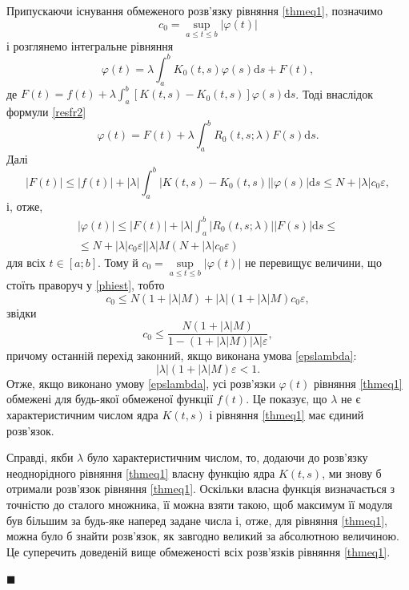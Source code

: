 \documentclass[14pt,twoside]{extreport}
\theoremstyle{mystyle}
\renewenvironment{proof}{{\bfseries Доведення.}}{$\blacksquare$}
\numberwithin{equation}{chapter}
\begin{document}
\begin{proof}
Припускаючи існування обмеженого розв'язку рівняння \eqref{thmeq1}, позначимо
\[
 c_0 = \sup\limits_{a \leqslant t \leqslant b} |\varphi (t)|
\]
і розглянемо інтегральне рівняння
\[
 \varphi(t) = \lambda \int_{a}^{b} K_0(t, s) \varphi(s) \mathrm{d}s + F(t),
\]
де $F(t) = f(t) + \lambda \int_{a}^{b} [K(t, s) - K_0(t, s)] \varphi(s) \mathrm{d}s$. Тоді внаслідок формули \eqref{resfr2}
\[
 \varphi(t) = F(t) + \lambda \int_{a}^{b} R_0(t, s; \lambda) F(s) \mathrm{d}s.
\]
Далі
\[
 |F(t)| \leqslant |f(t)| + |\lambda| \int_{a}^{b} |K(t, s) - K_0(t, s)| |\varphi(s)| \mathrm{d}s \leqslant N + |\lambda| c_0 \varepsilon,
\]
і, отже,
\begin{multline}\label{phiest}
 |\varphi(t)| \leqslant |F(t)| + |\lambda| \int_{a}^{b} |R_0(t, s; \lambda)| |F(s)| \mathrm{d}s \leqslant\\
 \leqslant N + |\lambda| c_0 \varepsilon | |\lambda| M (N + |\lambda| c_0 \varepsilon)
\end{multline}
для всіх $t\in[a; b]$. Тому й $c_0 = \sup\limits_{a \leqslant t \leqslant b} |\varphi(t)|$ не перевищує величини, що стоїть праворуч у \eqref{phiest}, тобто
\[
 c_0 \leqslant N(1+ |\lambda| M) + |\lambda| (1 + |\lambda|M) c_0 \varepsilon,
\]
звідки
\begin{equation}\label{c0est}
 c_0 \leqslant \frac{N(1 + |\lambda| M)}{1-(1 + |\lambda| M) |\lambda| \varepsilon},
\end{equation}
причому останній перехід законний, якщо виконана умова \eqref{epslambda}:
\[
 |\lambda| (1 + |\lambda| M) \varepsilon < 1.
\]
Отже, якщо виконано умову \eqref{epslambda}, усі розв'язки $\varphi(t)$ рівняння \eqref{thmeq1} обмежені для будь-якої обмеженої функції $f(t)$. Це показує, що $\lambda$ не є характеристичним числом ядра $K(t, s)$ і рівняння \eqref{thmeq1} має єдиний розв'язок.

Справді, якби $\lambda$ було характеристичним числом, то, додаючи до розв'язку неоднорідного рівняння \eqref{thmeq1} власну функцію ядра $K(t, s)$, ми знову б отримали розв'язок рівняння \eqref{thmeq1}. Оскільки власна функція визначається з точністю до сталого множника, її можна взяти такою, щоб максимум її модуля був більшим за будь-яке наперед задане числа і, отже, для рівняння \eqref{thmeq1}, можна було б знайти розв'язок, як завгодно великий за абсолютною величиною. Це суперечить доведеній вище обмеженості всіх розв'язків рівняння \eqref{thmeq1}.


\end{proof}
\end{document}
